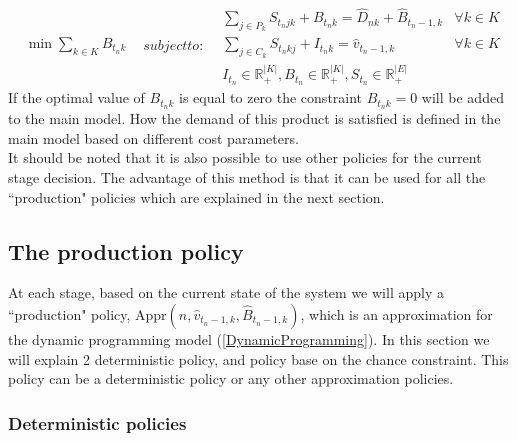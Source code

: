 \documentclass[10pt]{article}
\newcommand{\ti}{t} %
\newcommand{\ka}{k} %
\newcommand{\KA}{K}
\newcommand{\Ka}{K}
\newcommand{\jey}{j} %
\begin{document}
\begin{subequations}
\label{Currentstage}

\begin{flalign}
&\min  \sum_{k \in K}  {B}_{ t_n \ka} & \label{eq:Current_obj} 
\end{flalign}
 subject to:
\begin{flalign}
  &  \sum_{j\in P_{k}} {S}_{\ti_n  \jey \ka} + B_{t_n \ka}  = \hat{D}_{n \ka} + \hat{B}_{t_n-1, \ka} &\forall \ka \in \Ka  &     \label{eq:Current_inventory_tn}&\\
&  \sum_{j\in C_{k}} {S}_{\ti_n \ka \jey} + I_{ t_n \ka} = \hat{v}_{t_n-1 , \ka} &\forall \ka \in \Ka  &     \label{eq:Current_Orderup}&\\
& {I}_{ \ti_n } \in \mathbb{R}_{+}^{|\KA|} , {B}_{ \ti_n } \in \mathbb{R}_{+}^{|\KA|} , {S}_{\ti_n} \in \mathbb{R}_{+}^{|E|} &    & \label{eq:Sub_FD_bound2}
\end{flalign}
\end{subequations}
If the optimal value of  $B_{ t_n \ka}$  is equal to zero the constraint $B_{ t_n \ka} = 0$ will be added to the main model. How the demand of this product is satisfied is defined in the main model based on different cost parameters.\\
It should be noted that it is also possible to use other policies for the current stage decision. The advantage of this method is that it can be used for all the ``production" policies which are explained in the next section.

\subsection{The production policy}
At each stage, based on the current state of the system we will apply a ``production" policy, Appr$(n,\hat{v}_{t_n-1 ,k}, \hat{B}_{t_n-1 , \ka})$, which is an approximation for the dynamic programming model (\ref{DynamicProgramming}). In this section we will explain 2 deterministic policy, and policy base on the chance constraint. This policy can be a deterministic policy or any other approximation policies. 
 
\subsubsection{Deterministic policies}
\end{document}
